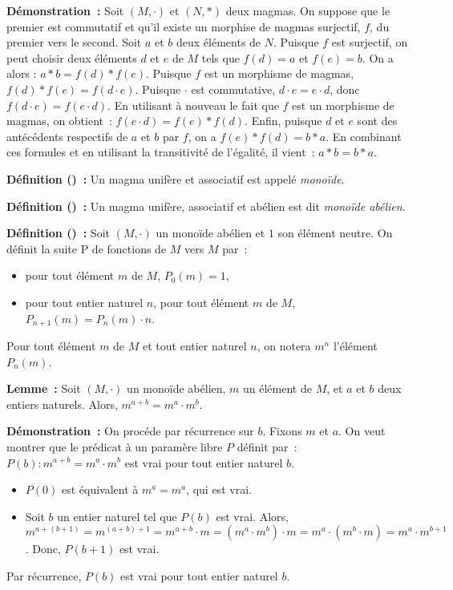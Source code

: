 \noindent\textbf{Démonstration :} Soit $(M,\cdot)$ et $(N,\ast)$ deux magmas. 
    On suppose que le premier est commutatif et qu'il existe un morphise de magmas surjectif, $f$, du premier vers le second. 
    Soit $a$ et $b$ deux éléments de $N$. 
    Puisque $f$ est surjectif, on peut choisir deux éléments $d$ et $e$ de $M$ tels que $f(d) = a$ et $f(e) = b$.
    On a alors : $a \ast b = f(d) \ast f(e)$.
    Puisque $f$ est un morphisme de magmas, $f(d) \ast f(e) = f(d \cdot e)$.
    Puisque $\cdot$ est commutative, $d \cdot e = e \cdot d$, donc $f(d \cdot e) = f(e \cdot d)$. 
    En utilisant à nouveau le fait que $f$ est un morphisme de magmas, on obtient : $f(e \cdot d) = f(e) \ast f(d)$. 
    Enfin, puisque $d$ et $e$ sont des antécédents respectifs de $a$ et $b$ par $f$, on a $f(e) \ast f(d) = b \ast a$. 
    En combinant ces formules et en utilisant la transitivité de l'égalité, il vient : $a \ast b = b \ast a$.

    \hfill \square

\medskip

\noindent\textbf{Définition () :} Un magma unifère et associatif est appelé \textit{monoïde}.

\medskip

\noindent\textbf{Définition () :} Un magma unifère, associatif et abélien est dit \textit{monoïde abélien}.

\medskip

\noindent\textbf{Définition () :} Soit $(M,\cdot)$ un monoïde abélien et $1$ son élément neutre.
    On définit la suite $\mathrm{P}$ de fonctions de $M$ vers $M$ par : 
    \begin{itemize}[nosep]
        \item pour tout élément $m$ de $M$, $P_0(m) = 1$,
        \item pour tout entier naturel $n$, pour tout élément $m$ de $M$, $P_{n+1}(m) = P_n(m) \cdot n$.
    \end{itemize}
    Pour tout élément $m$ de $M$ et tout entier naturel $n$, on notera $m^n$ l'élément $P_n(m)$.

\medskip

\noindent\textbf{Lemme :} Soit $(M,\cdot)$ un monoïde abélien, $m$ un élément de $M$, et $a$ et $b$ deux entiers naturels. 
    Alors, $m^{a + b} = m^a \cdot m^b$.

\medskip

\noindent\textbf{Démonstration :} On procéde par récurrence sur $b$.
    Fixons $m$ et $a$.
    On veut montrer que le prédicat à un paramère libre $P$ définit par : $P(b): m^{a+b} = m^a \cdot m^b$ est vrai pour tout entier naturel $b$.
    \begin{itemize}[nosep]
        \item $P(0)$ est équivalent à $m^a = m^a$, qui est vrai.
        \item Soit $b$ un entier naturel tel que $P(b)$ est vrai. 
            Alors, $m^{a+(b+1)} = m^{(a+b)+1} = m^{a+b} \cdot m = (m^a \cdot m^b) \cdot m = m^a \cdot (m^b \cdot m) = m^a \cdot m^{b+1}$.
            Donc, $P(b+1)$ est vrai.
    \end{itemize}
    Par récurrence, $P(b)$ est vrai pour tout entier naturel $b$.

